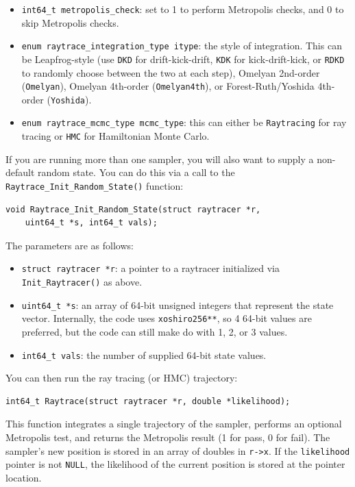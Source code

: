 \documentclass[12pt]{article}
\begin{document}
\begin{itemize}
\item \lstinline{int64_t metropolis_check}: set to 1 to perform Metropolis checks, and 0 to skip Metropolis checks.
\item \lstinline{enum raytrace_integration_type itype}: the style of integration.  This can be Leapfrog-style (use \texttt{DKD} for drift-kick-drift, \texttt{KDK} for kick-drift-kick, or \texttt{RDKD} to randomly choose between the two at each step), Omelyan 2nd-order (\texttt{Omelyan}), Omelyan 4th-order (\texttt{Omelyan4th}), or Forest-Ruth/Yoshida 4th-order (\texttt{Yoshida}).
\item \lstinline{enum raytrace_mcmc_type mcmc_type}: this can either be \texttt{Raytracing} for ray tracing or \texttt{HMC} for Hamiltonian Monte Carlo.
\end{itemize}

If you are running more than one sampler, you will also want to supply a non-default random state.  You can do this via a call to the \lstinline{Raytrace_Init_Random_State()} function:
\begin{lstlisting}
void Raytrace_Init_Random_State(struct raytracer *r, 
	uint64_t *s, int64_t vals);
\end{lstlisting}
The parameters are as follows:
\begin{itemize}
\item \lstinline{struct raytracer *r}: a pointer to a raytracer initialized via \lstinline{Init_Raytracer()} as above.
\item \lstinline{uint64_t *s}: an array of 64-bit unsigned integers that represent the state vector.  Internally, the code uses \texttt{xoshiro256**}, so 4 64-bit values are preferred, but the code can still make do with 1, 2, or 3 values.
\item \lstinline{int64_t vals}: the number of supplied 64-bit state values.
\end{itemize}
You can then run the ray tracing (or HMC) trajectory:
\begin{lstlisting}
int64_t Raytrace(struct raytracer *r, double *likelihood);
\end{lstlisting}
This function integrates a single trajectory of the sampler, performs an optional Metropolis test, and returns the Metropolis result (1 for pass, 0 for fail).  The sampler's new position is stored in an array of doubles in \lstinline{r->x}.  If the \lstinline{likelihood} pointer is not \lstinline{NULL}, the likelihood of the current position is stored at the pointer location.
\end{document}
